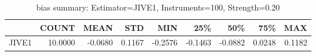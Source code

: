 \begin{table}[ht]
\centering
\caption{bias summary: Estimator=JIVE1, Instruments=100, Strength=0.20}
\begin{tabular}{lrrrrrrrr}
\toprule
 & COUNT & MEAN & STD & MIN & 25\% & 50\% & 75\% & MAX \\
\midrule
JIVE1 & 10.0000 & -0.0680 & 0.1167 & -0.2576 & -0.1463 & -0.0882 & 0.0248 & 0.1182 \\
\bottomrule
\end{tabular}
\end{table}
